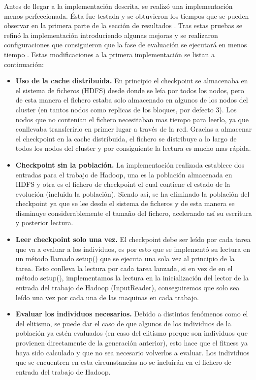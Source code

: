 Antes de llegar a la implementaci\'on descrita, se realiz\'o una implementación menos perfeccionada. \'Esta fue testada y se obtuvieron los tiempos que se pueden observar en la primera parte de la sección de resultados . Tras estas pruebas se refin\'o la implementación introduciendo algunas mejoras y se realizaron configuraciones que consiguieron que la fase de evaluación se ejecutar\'a en menos tiempo . Estas modificaciones a la primera implementación se listan a continuación:

\begin{itemize}
	\item \textbf{Uso de la cache distribuida.} En principio el checkpoint se almacenaba en el sistema de ficheros (HDFS) desde donde se leía por todos los nodos, pero de esta manera el fichero estaba solo almacenado en algunos de los nodos del cluster (en tantos nodos como replicas de los bloques, por defecto 3). Los nodos que no contenían el fichero necesitaban mas tiempo para leerlo, ya que conllevaba transferirlo en primer lugar a través de la red. Gracias a almacenar el checkpoint en la cache distribuida, el fichero se distribuye a lo largo de todos los nodos del cluster y por consiguiente la lectura es mucho mas rápida.
	\item \textbf{Checkpoint sin la población.} La implementación realizada establece dos entradas para el trabajo de Hadoop, una es la población almacenada en HDFS y otra es el fichero de checkpoint el cual contiene el estado de la evolución (incluida la población). Siendo así, se ha eliminado la población del checkpoint ya que se lee desde el sistema de ficheros y de esta manera se disminuye considerablemente el tamaño del fichero, acelerando as\'i su escritura y posterior lectura.
	\item \textbf{Leer checkpoint solo una vez.} El checkpoint debe ser leído por cada tarea que va a evaluar a los individuos, es por esto que se implement\'o su lectura en un método llamado setup() que se ejecuta una sola vez al principio de la tarea. Esto conlleva la lectura por cada tarea lanzada, si en vez de en el método setup(), implementamos la lectura en la inicializaci\'on del lector de la entrada del trabajo de Hadoop (InputReader), conseguiremos que solo sea leído una vez por cada una de las maquinas en cada trabajo.
	\item \textbf{Evaluar los individuos necesarios.} Debido a distintos fenómenos como el del elitismo, se puede dar el caso de que algunos de los individuos de la población ya est\'en evaluados (en caso del elitismo porque son individuos que provienen directamente de la generaci\'on anterior), esto hace que el fitness ya haya sido calculado y que no sea necesario volverlos a evaluar. Los individuos que se encuentren en esta circunstancias no se incluirán en el fichero de entrada del trabajo de Hadoop.		

\end{itemize}
